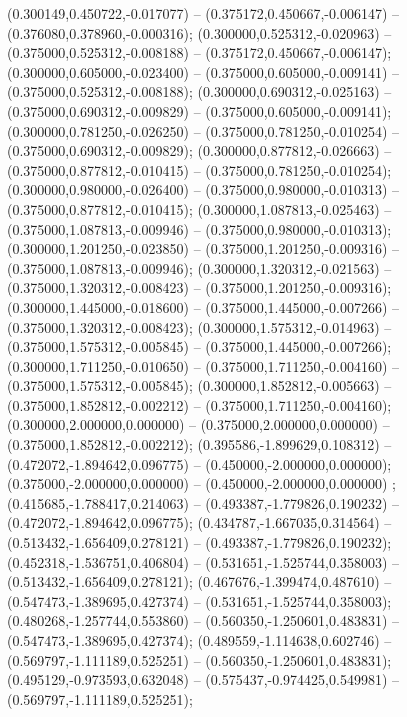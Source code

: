  (0.300149,0.450722,-0.017077) -- (0.375172,0.450667,-0.006147) -- (0.376080,0.378960,-0.000316);
 (0.300000,0.525312,-0.020963) -- (0.375000,0.525312,-0.008188) -- (0.375172,0.450667,-0.006147);
 (0.300000,0.605000,-0.023400) -- (0.375000,0.605000,-0.009141) -- (0.375000,0.525312,-0.008188);
 (0.300000,0.690312,-0.025163) -- (0.375000,0.690312,-0.009829) -- (0.375000,0.605000,-0.009141);
 (0.300000,0.781250,-0.026250) -- (0.375000,0.781250,-0.010254) -- (0.375000,0.690312,-0.009829);
 (0.300000,0.877812,-0.026663) -- (0.375000,0.877812,-0.010415) -- (0.375000,0.781250,-0.010254);
 (0.300000,0.980000,-0.026400) -- (0.375000,0.980000,-0.010313) -- (0.375000,0.877812,-0.010415);
 (0.300000,1.087813,-0.025463) -- (0.375000,1.087813,-0.009946) -- (0.375000,0.980000,-0.010313);
 (0.300000,1.201250,-0.023850) -- (0.375000,1.201250,-0.009316) -- (0.375000,1.087813,-0.009946);
 (0.300000,1.320312,-0.021563) -- (0.375000,1.320312,-0.008423) -- (0.375000,1.201250,-0.009316);
 (0.300000,1.445000,-0.018600) -- (0.375000,1.445000,-0.007266) -- (0.375000,1.320312,-0.008423);
 (0.300000,1.575312,-0.014963) -- (0.375000,1.575312,-0.005845) -- (0.375000,1.445000,-0.007266);
 (0.300000,1.711250,-0.010650) -- (0.375000,1.711250,-0.004160) -- (0.375000,1.575312,-0.005845);
 (0.300000,1.852812,-0.005663) -- (0.375000,1.852812,-0.002212) -- (0.375000,1.711250,-0.004160);
 (0.300000,2.000000,0.000000) -- (0.375000,2.000000,0.000000) -- (0.375000,1.852812,-0.002212);
 (0.395586,-1.899629,0.108312) -- (0.472072,-1.894642,0.096775) -- (0.450000,-2.000000,0.000000);
 (0.375000,-2.000000,0.000000) -- (0.450000,-2.000000,0.000000) ;
 (0.415685,-1.788417,0.214063) -- (0.493387,-1.779826,0.190232) -- (0.472072,-1.894642,0.096775);
 (0.434787,-1.667035,0.314564) -- (0.513432,-1.656409,0.278121) -- (0.493387,-1.779826,0.190232);
 (0.452318,-1.536751,0.406804) -- (0.531651,-1.525744,0.358003) -- (0.513432,-1.656409,0.278121);
 (0.467676,-1.399474,0.487610) -- (0.547473,-1.389695,0.427374) -- (0.531651,-1.525744,0.358003);
 (0.480268,-1.257744,0.553860) -- (0.560350,-1.250601,0.483831) -- (0.547473,-1.389695,0.427374);
 (0.489559,-1.114638,0.602746) -- (0.569797,-1.111189,0.525251) -- (0.560350,-1.250601,0.483831);
 (0.495129,-0.973593,0.632048) -- (0.575437,-0.974425,0.549981) -- (0.569797,-1.111189,0.525251);
